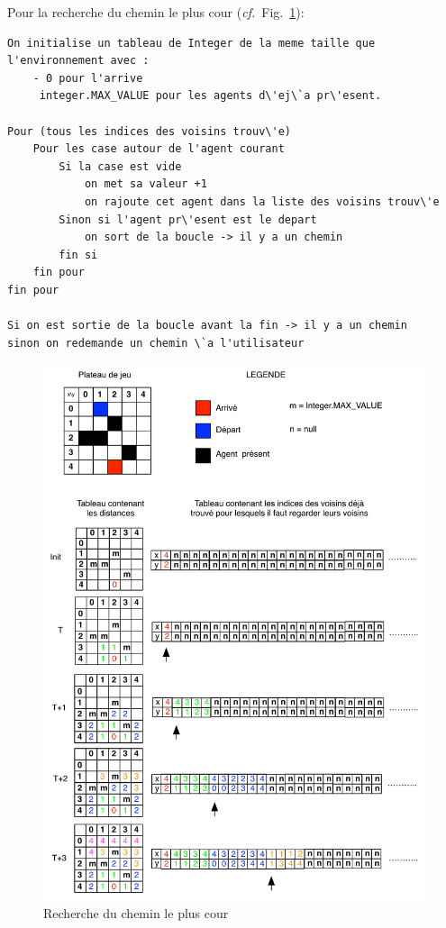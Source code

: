 \documentclass[a4paper,10pt]{article}
\begin{document}
Pour la recherche du chemin le plus cour (\emph{cf.}~Fig.~\ref{recherche_chemin_plus_cour}): \\
\begin{Verbatim}[commandchars=\\\{\}]
On initialise un tableau de Integer de la meme taille que l'environnement avec :
	- 0 pour l'arrive
	 integer.MAX_VALUE pour les agents d\'ej\`a pr\'esent.

Pour (tous les indices des voisins trouv\'e) 
	Pour les case autour de l'agent courant
		Si la case est vide
			on met sa valeur +1
			on rajoute cet agent dans la liste des voisins trouv\'e
		Sinon si l'agent pr\'esent est le depart
			on sort de la boucle -> il y a un chemin
		fin si
	fin pour
fin pour

Si on est sortie de la boucle avant la fin -> il y a un chemin
sinon on redemande un chemin \`a l'utilisateur
\end{Verbatim}

\begin{figure}[ht]
\begin{center}
	\includegraphics[width=14cm]{images/recherche_chemin_plus_cour}
\end{center}
	\caption{Recherche du chemin le plus cour}
	\label{recherche_chemin_plus_cour}
\end{figure}
\end{document}
